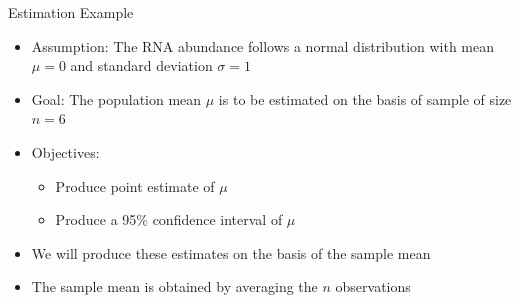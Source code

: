 \documentclass[xcolor=x11names,compress]{beamer}\usepackage[]{graphicx}\usepackage[]{color}
\begin{document}
\begin{frame}[fragile]{Estimation Example}

  \begin{itemize}  
  \item Assumption: The RNA abundance follows a normal distribution with mean $\mu=0$
        and standard deviation $\sigma=1$
  \item Goal: The population mean $\mu$ is to be estimated on the basis of sample of size
        $n=6$
  \item Objectives:
    \begin{itemize}
    \item Produce point estimate of $\mu$ 
    \item Produce a 95\% confidence interval of $\mu$
    \end{itemize}
  \item We will produce these estimates on the basis of the sample mean
  \item The sample mean is obtained by averaging the $n$ observations
  \end{itemize}
\end{frame}
\end{document}

